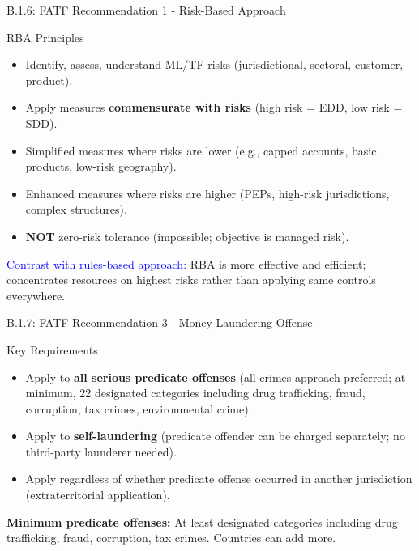 \documentclass{beamer}
\begin{document}
	\begin{frame}{B.1.6: FATF Recommendation 1 - Risk-Based Approach}
		\begin{block}{RBA Principles}
			\begin{itemize}
				\item Identify, assess, understand ML/TF risks (jurisdictional, sectoral, customer, product).
				\item Apply measures \textbf{commensurate with risks} (high risk = EDD, low risk = SDD).
				\item Simplified measures where risks are lower (e.g., capped accounts, basic products, low-risk geography).
				\item Enhanced measures where risks are higher (PEPs, high-risk jurisdictions, complex structures).
				\item \textbf{NOT} zero-risk tolerance (impossible; objective is managed risk).
			\end{itemize}
		\end{block}
		\textcolor{blue}{Contrast with rules-based approach:} RBA is more effective and efficient; concentrates resources on highest risks rather than applying same controls everywhere.
	\end{frame}
	
	\begin{frame}{B.1.7: FATF Recommendation 3 - Money Laundering Offense}
		\begin{block}{Key Requirements}
			\begin{itemize}
				\item Apply to \textbf{all serious predicate offenses} (all-crimes approach preferred; at minimum, 22 designated categories including drug trafficking, fraud, corruption, tax crimes, environmental crime).
				\item Apply to \textbf{self-laundering} (predicate offender can be charged separately; no third-party launderer needed).
				\item Apply regardless of whether predicate offense occurred in another jurisdiction (extraterritorial application).
			\end{itemize}
		\end{block}
		\textbf{Minimum predicate offenses:} At least designated categories including drug trafficking, fraud, corruption, tax crimes. Countries can add more.
	\end{frame}
	
\end{document}
